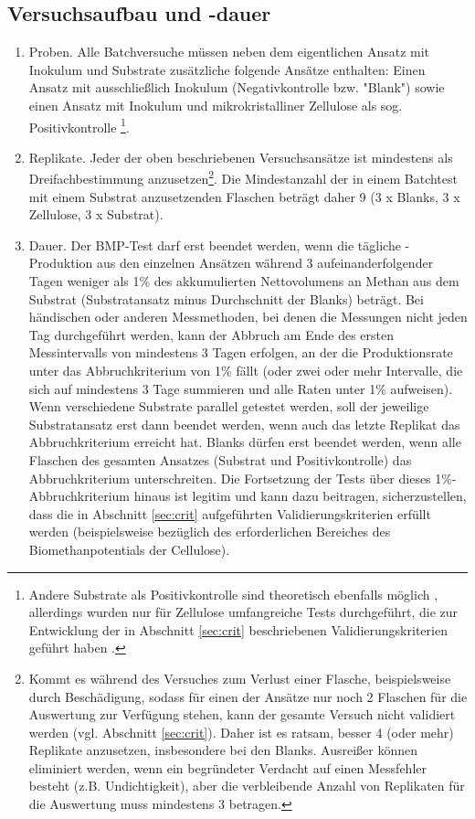\documentclass[]{article}
\begin{document}
\subsection{Versuchsaufbau und -dauer}
\label{sec:setup}
\begin{enumerate}
  \item Proben. 
    Alle Batchversuche müssen neben dem eigentlichen Ansatz mit Inokulum und Substrate zusätzliche folgende Ansätze enthalten: Einen Ansatz mit ausschließlich Inokulum (Negativkontrolle bzw. "Blank") sowie einen Ansatz mit Inokulum und mikrokristalliner Zellulose als sog. Positivkontrolle
    \footnote{
      Andere Substrate als Positivkontrolle sind theoretisch ebenfalls möglich \citep{kochEvaluationCommonSupermarket2020}, allerdings wurden nur für Zellulose umfangreiche Tests durchgeführt, die zur Entwicklung der in Abschnitt \ref{sec:crit} beschriebenen Validierungskriterien geführt haben
      \citep{hafnerImprovingInterlaboratoryReproducibility2020}.
    }.
    \item Replikate. 
    Jeder der oben beschriebenen Versuchsansätze ist mindestens als Dreifachbestimmung anzusetzen\footnote{
      Kommt es während des Versuches zum Verlust einer Flasche, beispielsweise durch Beschädigung, sodass für einen der Ansätze nur noch 2 Flaschen für die Auswertung zur Verfügung stehen, kann der gesamte Versuch nicht validiert werden (vgl. Abschnitt \ref{sec:crit}).
      Daher ist es ratsam, besser 4 (oder mehr) Replikate anzusetzen, insbesondere bei den Blanks.
      Ausreißer können eliminiert werden, wenn ein begründeter Verdacht auf einen Messfehler besteht (z.B. Undichtigkeit), aber die verbleibende Anzahl von Replikaten für die Auswertung muss mindestens 3 betragen.
    }.
    Die Mindestanzahl der in einem Batchtest mit einem Substrat anzusetzenden Flaschen beträgt daher 9 (3 x Blanks, 3 x Zellulose, 3 x Substrat).
  \item Dauer. 
    Der BMP-Test darf erst beendet werden, wenn die tägliche -Produktion aus den einzelnen Ansätzen während 3 aufeinanderfolgender Tagen weniger als 1\% des akkumulierten Nettovolumens an Methan aus dem Substrat (Substratansatz minus Durchschnitt der Blanks) beträgt.
    Bei händischen oder anderen Messmethoden, bei denen die Messungen nicht jeden Tag durchgeführt werden, kann der Abbruch am Ende des ersten Messintervalls von mindestens 3 Tagen erfolgen, an der die Produktionsrate unter das Abbruchkriterium von 1\% fällt (oder zwei oder mehr Intervalle, die sich auf mindestens 3 Tage summieren und alle  Raten unter 1\% aufweisen).
    Wenn verschiedene Substrate parallel getestet werden, soll der jeweilige Substratansatz erst dann beendet werden, wenn auch das letzte Replikat das Abbruchkriterium erreicht hat.
    Blanks dürfen erst beendet werden, wenn alle Flaschen des gesamten Ansatzes (Substrat und Positivkontrolle) das Abbruchkriterium unterschreiten.
    Die Fortsetzung der Tests über dieses 1\%-Abbruchkriterium hinaus ist legitim und kann dazu beitragen, sicherzustellen, dass die in Abschnitt \ref{sec:crit} aufgeführten Validierungskriterien erfüllt werden (beispielsweise bezüglich des erforderlichen Bereiches des Biomethanpotentials der Cellulose).
\end{enumerate}
\end{document}
